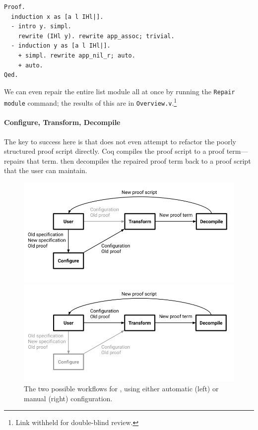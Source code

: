 \begin{lstlisting}
Proof.
  induction x as [a l IHl|].
  - intro y. simpl.
    rewrite (IHl y). rewrite app_assoc; trivial.
  - induction y as [a l IHl|].
    + simpl. rewrite app_nil_r; auto.
    + auto.
Qed.
\end{lstlisting}
We can even repair the entire list module all at once by running the \lstinline{Repair module}
command; the results of this are in \lstinline{Overview.v}.\footnote{Link withheld for double-blind review.} %

\paragraph{Configure, Transform, Decompile}
The key to success here is that \toolname does not even attempt to refactor the poorly structured proof script directly.
Coq compiles the proof script to a proof term---\toolname repairs that term.
\toolname then decompiles the repaired proof term back to a proof script that the user can maintain.

\begin{figure}
\begin{minipage}{0.49\textwidth}
\includegraphics[width=\linewidth]{workflowa.png}
\end{minipage}
\hfill
\begin{minipage}{0.49\textwidth}
\includegraphics[width=\linewidth]{workflowb.png}
\end{minipage}
\caption{The two possible workflows for \toolname, using either automatic (left) or manual (right) configuration.}
\label{fig:system}
\end{figure}

